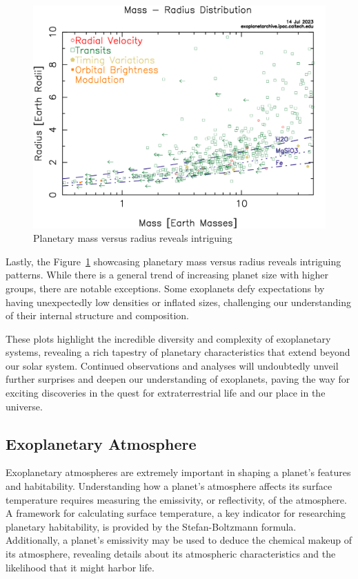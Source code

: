 \documentclass{article}
\begin{document}
\begin{figure}[H]
    \centering
    \includegraphics[width=1\linewidth]{image/mass_radius.png}
  \captionsetup{font=small} 
    \caption{Planetary mass versus radius reveals intriguing}
    \label{fig:mass_radius}
\end{figure}

Lastly, the Figure~\ref{fig:mass_radius} showcasing planetary mass versus radius reveals intriguing patterns. While there is a general trend of increasing planet size with higher groups, there are notable exceptions. Some exoplanets defy expectations by having unexpectedly low densities or inflated sizes, challenging our understanding of their internal structure and composition.

These plots highlight the incredible diversity and complexity of exoplanetary systems, revealing a rich tapestry of planetary characteristics that extend beyond our solar system. Continued observations and analyses will undoubtedly unveil further surprises and deepen our understanding of exoplanets, paving the way for exciting discoveries in the quest for extraterrestrial life and our place in the universe.

\subsection{Exoplanetary Atmosphere}

Exoplanetary atmospheres are extremely important in shaping a planet's features and habitability. Understanding how a planet's atmosphere affects its surface temperature requires measuring the emissivity, or reflectivity, of the atmosphere. A framework for calculating surface temperature, a key indicator for researching planetary habitability, is provided by the Stefan-Boltzmann formula. Additionally, a planet's emissivity may be used to deduce the chemical makeup of its atmosphere, revealing details about its atmospheric characteristics and the likelihood that it might harbor life.
\end{document}
